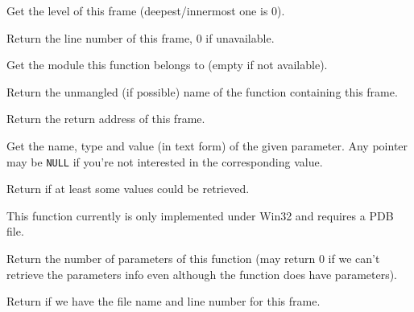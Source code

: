 Get the level of this frame (deepest/innermost one is $0$).


\label{wxstackframegetline}


Return the line number of this frame, $0$ if unavailable.




\label{wxstackframegetmodule}


Get the module this function belongs to (empty if not available).


\label{wxstackframegetname}


Return the unmangled (if possible) name of the function containing this
frame.


\label{wxstackframegetoffset}


Return the return address of this frame.


\label{wxstackframegetparam}


Get the name, type and value (in text form) of the given parameter.
Any pointer may be \texttt{NULL} if you're not interested in the corresponding
value.

Return \true if at least some values could be retrieved.

This function currently is only implemented under Win32 and requires a PDB
file.


\label{wxstackframegetparamcount}


Return the number of parameters of this function (may return $0$ if we
can't retrieve the parameters info even although the function does have
parameters).


\label{wxstackframehassourcelocation}


Return \true if we have the file name and line number for this frame.


